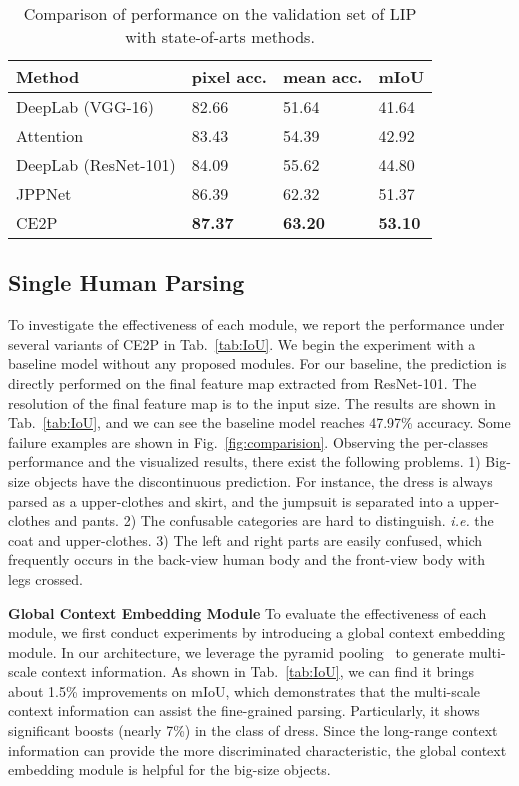 \documentclass[letterpaper]{article} \usepackage{formatting-instructions-latex-2019}  \usepackage{times}  \usepackage{helvet}  \usepackage{courier}  \usepackage{url}  \usepackage{graphicx}  \frenchspacing  \setlength{\pdfpagewidth}{8.5in}  \setlength{\pdfpageheight}{11in}
\newcommand{\ie}{\emph{i.e. }}
\begin{document}
\begin{table}[htbp]
    \footnotesize
    \caption{Comparison of performance on the validation set of LIP with state-of-arts methods.}
    \label{tab:IoU_others}
    \centering
    \begin{tabular}{llll}
        \toprule 
        Method & pixel acc. & mean acc. & mIoU  \\ \midrule
        DeepLab (VGG-16) & 82.66 & 51.64 & 41.64 \\  
        Attention & 83.43 & 54.39 & 42.92 \\  
        DeepLab (ResNet-101) & 84.09 & 55.62 & 44.80 \\  
        JPPNet~\cite{Liang2018} &  86.39 & 62.32 &  51.37 \\  
        CE2P & \bf{87.37} & \bf{63.20} & \bf{53.10} \\ \bottomrule 
    \end{tabular} 
\end{table}

\subsection{Single Human Parsing} 
To investigate the effectiveness of each module, we report the performance under several variants of CE2P in Tab.~\ref{tab:IoU}. We begin the experiment with a baseline model without any proposed modules. For our baseline, the prediction is directly performed on the final feature map extracted from ResNet-101. The resolution of the final feature map is  to the input size. The results are shown in Tab.~\ref{tab:IoU}, and we can see the baseline model reaches 47.97\% accuracy. Some failure examples are shown in Fig.~\ref{fig:comparision}. Observing the per-classes performance and the visualized results, there exist the following problems.  1) Big-size objects have the discontinuous prediction. For instance, the dress is always parsed as a upper-clothes and skirt, and the jumpsuit is separated into a upper-clothes and pants. 2) The confusable categories are hard to distinguish. \ie the coat and upper-clothes. 3) The left and right parts are easily confused, which frequently occurs in the back-view human body and the front-view body with legs crossed. 
  

\noindent\textbf{Global Context Embedding Module} To evaluate the effectiveness of each module, we first conduct experiments by introducing a global context embedding module. In our architecture, we leverage the pyramid pooling~\cite{Zhao2017} to generate multi-scale context information. As shown in Tab.~\ref{tab:IoU}, we can find it brings about 1.5\% improvements on mIoU, which demonstrates that the multi-scale context information can assist the fine-grained parsing. Particularly, it shows significant boosts (nearly 7\%) in the class of dress. Since the long-range context information can provide the more discriminated characteristic, the global context embedding module is helpful for the big-size objects.   
   
\end{document}
